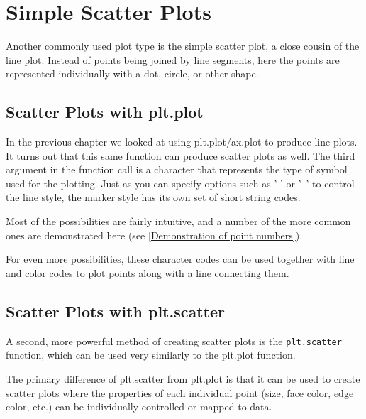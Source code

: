 \chapter{Simple Scatter Plots\label{Ch27}}
Another commonly used plot type is the simple scatter plot, a close cousin of the line
plot. Instead of points being joined by line segments, here the points are represented
individually with a dot, circle, or other shape.

\section{Scatter Plots with plt.plot}

In the previous chapter we looked at using plt.plot/ax.plot to produce line plots. It
turns out that this same function can produce scatter plots as well. The third argument in the function call is a character that represents the type of symbol used for the plotting. Just as you can specify options such as '-' or '--' to control the line style, the marker style has its own set of short string codes.

Most of the possibilities are fairly intuitive, and a number of
the more common ones are demonstrated here (see \autoref{Demonstration of point numbers}).


For even more possibilities, these character codes can be used together with line and
color codes to plot points along with a line connecting them.

\section{Scatter Plots with plt.scatter}
A second, more powerful method of creating scatter plots is the \verb|plt.scatter| function, which can be used very similarly to the plt.plot function.

\begin{tcolorbox}
    The primary difference of plt.scatter from plt.plot is that it can be used to create
    scatter plots where the properties of each individual point (size, face color, edge color,
    etc.) can be individually controlled or mapped to data.
\end{tcolorbox}

